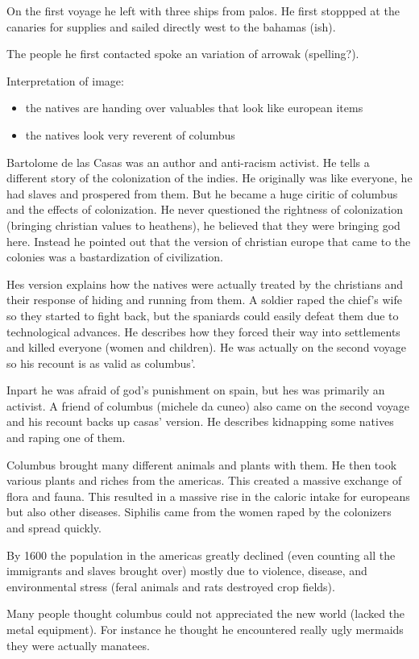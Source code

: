 \documentclass{article}
\begin{document}
On the first voyage he left with three ships from palos. He first stoppped at the canaries for supplies and sailed directly west to the bahamas (ish).

The people he first contacted spoke an variation of arrowak (spelling?).

Interpretation of image:
\begin{itemize}
	\item the natives are handing over valuables that look like european items
	\item the natives look very reverent of columbus
\end{itemize}

Bartolome de las Casas was an author and anti-racism activist. He tells a different story of the colonization of the indies. He originally was like everyone, he had slaves and prospered from them. But he became a huge ciritic of columbus and the effects of colonization. He never questioned the rightness of colonization (bringing christian values to heathens), he believed that they were bringing god here. Instead he pointed out that the version of christian europe that came to the colonies was a bastardization of civilization.

Hes version explains how the natives were actually treated by the christians and their response of hiding and running from them. A soldier raped the chief's wife so they started to fight back, but the spaniards could easily defeat them due to technological advances. He describes how they forced their way into settlements and killed everyone (women and children). He was actually on the second voyage so his recount is as valid as columbus'.

Inpart he was afraid of god's punishment on spain, but hes was primarily an activist. A friend of columbus (michele da cuneo) also came on the second voyage and his recount backs up casas' version. He describes kidnapping some natives and raping one of them.

Columbus brought many different animals and plants with them. He then took various plants and riches from the americas. This created a massive exchange of flora and fauna. This resulted in a massive rise in the caloric intake for europeans but also other diseases. Siphilis came from the women raped by the colonizers and spread quickly.

By 1600 the population in the americas greatly declined (even counting all the immigrants and slaves brought over) mostly due to violence, disease, and environmental stress (feral animals and rats destroyed crop fields).

Many people thought columbus could not appreciated the new world (lacked the metal equipment). For instance he thought he encountered really ugly mermaids they were actually manatees.
\end{document}
